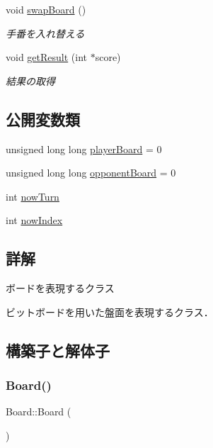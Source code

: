 \begin{DoxyCompactItemize}
void \mbox{\hyperlink{class_board_ab9840889c8175263c935c45ab4ea8aad}{swap\+Board}} ()
\begin{DoxyCompactList}\small\item\em 手番を入れ替える \end{DoxyCompactList}\item 
void \mbox{\hyperlink{class_board_acca28e5720f3d476264e18bf2be4e8ad}{get\+Result}} (int $\ast$score)
\begin{DoxyCompactList}\small\item\em 結果の取得 \end{DoxyCompactList}\end{DoxyCompactItemize}
\subsection*{公開変数類}
\begin{DoxyCompactItemize}
\item 
unsigned long long \mbox{\hyperlink{class_board_a3f5dd6aed9346e21df3ad7a49eb4aa33}{player\+Board}} = 0
\item 
unsigned long long \mbox{\hyperlink{class_board_a4bfa03bee32336269f5d9d2d259a1d1f}{opponent\+Board}} = 0
\item 
int \mbox{\hyperlink{class_board_afaab59020384a4975249c9b240c65b14}{now\+Turn}}
\item 
int \mbox{\hyperlink{class_board_a828fcce6e6515fde763ae6b05474f2d9}{now\+Index}}
\end{DoxyCompactItemize}


\subsection{詳解}
ボードを表現するクラス 

ビットボードを用いた盤面を表現するクラス． 

\subsection{構築子と解体子}
\mbox{\label{class_board_a9ee491d4fea680cf69b033374a9fdfcb}} 
\subsubsection{\texorpdfstring{Board()}{Board()}}
{\footnotesize\ttfamily Board\+::\+Board (\begin{DoxyParamCaption}{ }\end{DoxyParamCaption})\hspace{0.3cm}{\ttfamily [inline]}}



